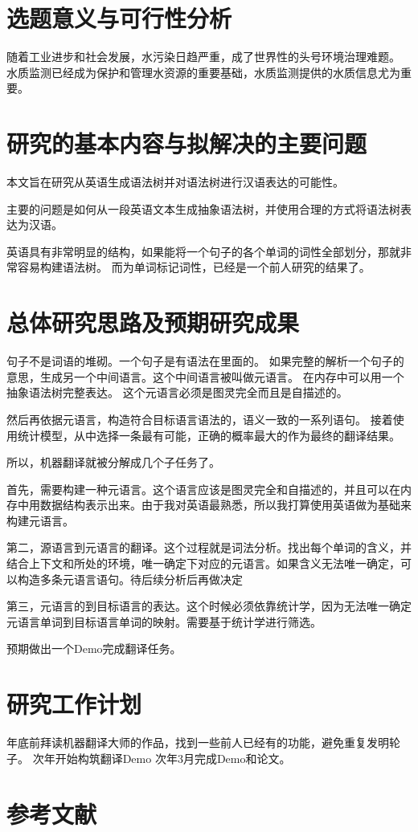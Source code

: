 \documentclass[12pt,a4paper]{article}
\begin{document}
{

\linespread{1.5}

\section{选题意义与可行性分析}
随着工业进步和社会发展，水污染日趋严重，成了世界性的头号环境治理难题。
水质监测已经成为保护和管理水资源的重要基础，水质监测提供的水质信息尤为重要。
\section{研究的基本内容与拟解决的主要问题}

本文旨在研究从英语生成语法树并对语法树进行汉语表达的可能性。

主要的问题是如何从一段英语文本生成抽象语法树，并使用合理的方式将语法树表达为汉语。

英语具有非常明显的结构，如果能将一个句子的各个单词的词性全部划分，那就非常容易构建语法树。
而为单词标记词性，已经是一个前人研究的结果了。


\section{总体研究思路及预期研究成果}

句子不是词语的堆砌。一个句子是有语法在里面的。 
如果完整的解析一个句子的意思，生成另一个中间语言。这个中间语言被叫做元语言。 在内存中可以用一个抽象语法树完整表达。
这个元语言必须是图灵完全而且是自描述的。 

然后再依据元语言，构造符合目标语言语法的，语义一致的一系列语句。 
接着使用统计模型，从中选择一条最有可能，正确的概率最大的作为最终的翻译结果。 

所以，机器翻译就被分解成几个子任务了。 

首先，需要构建一种元语言。这个语言应该是图灵完全和自描述的，并且可以在内存中用数据结构表示出来。由于我对英语最熟悉，所以我打算使用英语做为基础来构建元语言。 

第二，源语言到元语言的翻译。这个过程就是词法分析。找出每个单词的含义，并结合上下文和所处的环境，唯一确定下对应的元语言。如果含义无法唯一确定，可以构造多条元语言语句。待后续分析后再做决定 

第三，元语言的到目标语言的表达。这个时候必须依靠统计学，因为无法唯一确定元语言单词到目标语言单词的映射。需要基于统计学进行筛选。 

预期做出一个Demo完成翻译任务。

\section{研究工作计划}

年底前拜读机器翻译大师的作品，找到一些前人已经有的功能，避免重复发明轮子。
次年开始构筑翻译Demo
次年3月完成Demo和论文。

}

\section{参考文献}



\end{document}
